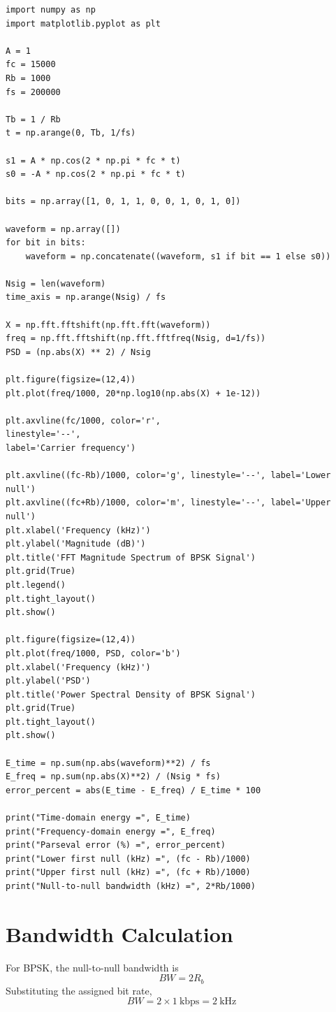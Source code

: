 \begin{lstlisting}[style=pythonstyle, caption={FFT and PSD Calculation for BPSK Signal}]
import numpy as np
import matplotlib.pyplot as plt

A = 1
fc = 15000
Rb = 1000
fs = 200000

Tb = 1 / Rb
t = np.arange(0, Tb, 1/fs)

s1 = A * np.cos(2 * np.pi * fc * t)
s0 = -A * np.cos(2 * np.pi * fc * t)

bits = np.array([1, 0, 1, 1, 0, 0, 1, 0, 1, 0])

waveform = np.array([])
for bit in bits:
    waveform = np.concatenate((waveform, s1 if bit == 1 else s0))

Nsig = len(waveform)
time_axis = np.arange(Nsig) / fs

X = np.fft.fftshift(np.fft.fft(waveform))
freq = np.fft.fftshift(np.fft.fftfreq(Nsig, d=1/fs))
PSD = (np.abs(X) ** 2) / Nsig

plt.figure(figsize=(12,4))
plt.plot(freq/1000, 20*np.log10(np.abs(X) + 1e-12))

plt.axvline(fc/1000, color='r', 
linestyle='--', 
label='Carrier frequency')

plt.axvline((fc-Rb)/1000, color='g', linestyle='--', label='Lower null')
plt.axvline((fc+Rb)/1000, color='m', linestyle='--', label='Upper null')
plt.xlabel('Frequency (kHz)')
plt.ylabel('Magnitude (dB)')
plt.title('FFT Magnitude Spectrum of BPSK Signal')
plt.grid(True)
plt.legend()
plt.tight_layout()
plt.show()

plt.figure(figsize=(12,4))
plt.plot(freq/1000, PSD, color='b')
plt.xlabel('Frequency (kHz)')
plt.ylabel('PSD')
plt.title('Power Spectral Density of BPSK Signal')
plt.grid(True)
plt.tight_layout()
plt.show()

E_time = np.sum(np.abs(waveform)**2) / fs
E_freq = np.sum(np.abs(X)**2) / (Nsig * fs)
error_percent = abs(E_time - E_freq) / E_time * 100

print("Time-domain energy =", E_time)
print("Frequency-domain energy =", E_freq)
print("Parseval error (%) =", error_percent)
print("Lower first null (kHz) =", (fc - Rb)/1000)
print("Upper first null (kHz) =", (fc + Rb)/1000)
print("Null-to-null bandwidth (kHz) =", 2*Rb/1000)
\end{lstlisting}
\newpage
\section{Bandwidth Calculation}
For BPSK, the null-to-null bandwidth is
\[
BW = 2R_b
\]
Substituting the assigned bit rate,
\[
BW = 2 \times 1~\text{kbps} = 2~\text{kHz}
\]

